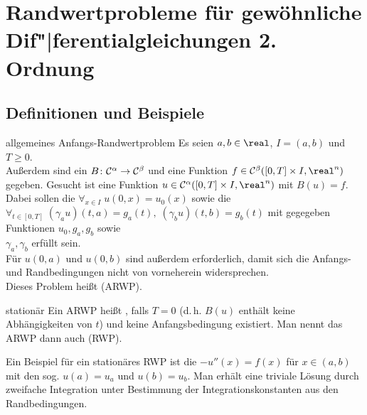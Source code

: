 \chapter{%
    Randwertprobleme für gewöhnliche Dif"|ferentialgleichungen 2. Ordnung%
}

\section{%
    Definitionen und Beispiele%
}

\begin{Def}{allgemeines Anfangs-Randwertproblem}
    Es seien $a, b \in \real$, $I = (a, b)$ und $T \ge 0$.\\
    Außerdem sind ein 
    $B\colon \mathcal{C}^\alpha \rightarrow \mathcal{C}^\beta$ und eine Funktion
    $f \in \C^\beta([0, T] \times I, \real^n)$ gegeben.
    Gesucht ist eine Funktion $u \in \C^\alpha([0, T] \times I, \real^n)$
    mit $B(u) = f$.\\
    Dabei sollen die 
    $\forall_{x \in I}\; u(0, x) = u_0(x)$ sowie die
    \\
    $\forall_{t \in [0, T]}\;
    (\gamma_a u)(t, a) = g_a(t),\;
    (\gamma_b u)(t, b) = g_b(t)$ mit gegegeben Funktionen $u_0, g_a, g_b$
    sowie\\
    $\gamma_a, \gamma_b$ erfüllt sein.\\
    Für $u(0, a)$ und $u(0, b)$ sind außerdem
     erforderlich, damit sich die
    Anfangs- und Randbedingungen nicht von vorneherein widersprechen.\\
    Dieses Problem heißt  (ARWP).
\end{Def}

\begin{Def}{stationär}
    Ein ARWP heißt , falls $T = 0$
    (d.\,h. $B(u)$ enthält keine Abhängigkeiten von $t$)
    und keine Anfangsbedingung existiert.
    Man nennt das ARWP dann auch  (RWP).
\end{Def}

\linie

\begin{Bsp}
    Ein Beispiel für ein stationäres RWP ist die
    $-u''(x) = f(x)$ für $x \in (a, b)$ mit den sog.
    $u(a) = u_a$ und $u(b) = u_b$.
    Man erhält eine triviale Lösung durch zweifache Integration unter
    Bestimmung der Integrationskonstanten aus den Randbedingungen.
\end{Bsp}

